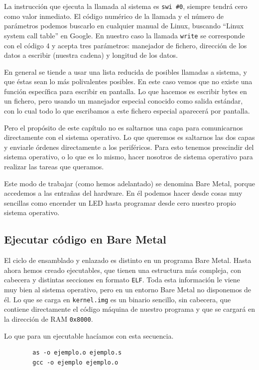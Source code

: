 La instrucción que ejecuta la llamada al sistema es {\tt swi \#0},
siempre tendrá cero como valor inmediato. El código numérico de
la llamada y el número de parámetros podemos buscarlo en cualquier
manual de Linux, buscando ``Linux system call table'' en Google. En
nuestro caso la llamada {\tt write} se corresponde con el código
4 y acepta tres parámetros: manejador de fichero, dirección de
los datos a escribir (nuestra cadena) y longitud de los datos.

En general se tiende a usar una lista reducida de posibles llamadas
a sistema, y que éstas sean lo más polivalentes posibles. En este
caso vemos que no existe una función específica para escribir en
pantalla. Lo que hacemos es escribir bytes en un fichero, pero usando
un manejador especial conocido como salida estándar, con lo cual todo
lo que escribamos a este fichero especial aparecerá por pantalla.

Pero el propósito de este capítulo no es saltarnos una capa
para comunicarnos directamente con el sistema operativo. Lo que queremos
es saltarnos las dos capas y enviarle órdenes directamente a los periféricos.
Para esto tenemos prescindir del sistema operativo, o lo que es lo mismo,
hacer nosotros de sistema operativo para realizar las tareas que queramos.

Este modo de trabajar (como hemos adelantado) se denomina Bare Metal, porque
accedemos a las entrañas del hardware. En él podemos hacer desde cosas
muy sencillas como encender un LED hasta programar desde cero nuestro propio
sistema operativo.

\subsection{Ejecutar código en Bare Metal}

El ciclo de ensamblado y enlazado es distinto en un programa Bare Metal. Hasta
ahora hemos creado ejecutables, que tienen una estructura más compleja, con cabecera y
distintas secciones en formato {\tt ELF}. Toda esta información le viene muy bien al
sistema operativo, pero en un entorno Bare Metal no disponemos de él. Lo que se carga
en {\tt kernel.img} es un binario sencillo, sin cabecera, que contiene directamente
el código máquina de nuestro programa y que se cargará en la dirección de RAM {\tt 0x8000}.

Lo que para un ejecutable hacíamos con esta secuencia.
\begin{lstlisting}
        as -o ejemplo.o ejemplo.s
        gcc -o ejemplo ejemplo.o
\end{lstlisting}


